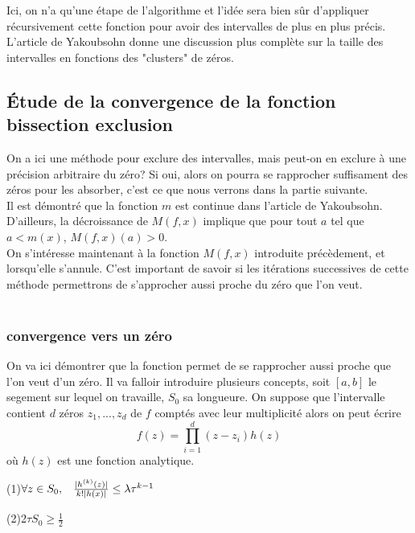 \documentclass[a4paper,10.5pt]{article}
\begin{document}
	\noindent Ici, on n'a qu'une étape de l'algorithme et l'idée sera bien sûr d'appliquer récursivement cette fonction pour avoir des intervalles de plus en plus précis. L'article de Yakoubsohn donne une discussion plus complète sur la taille des intervalles en fonctions des "clusters" de zéros.\\
	
	\subsection{Étude de la convergence de la fonction bissection exclusion}
	On a ici une méthode pour exclure des intervalles, mais peut-on en exclure à une précision arbitraire du zéro? Si oui, alors on pourra se rapprocher suffisament des zéros pour les absorber, c'est ce que nous verrons dans la partie suivante.\\
	Il est démontré que la fonction $m$ est continue dans l'article de Yakoubsohn. 
	D'ailleurs, la décroissance de $M(f,x)$ implique que pour tout $a$ tel que $a<m(x)$, $M(f,x)(a)>0$.\\
	On s'intéresse maintenant à la fonction $M(f,x)$ introduite précèdement, et lorsqu'elle s'annule. C'est important de savoir si les itérations successives de cette méthode permettrons de s'approcher aussi proche du zéro que l'on veut.\\
	\\
	\subsubsection{convergence vers un zéro}
	On va ici démontrer que la fonction permet de se rapprocher aussi proche que l'on veut d'un zéro.
	Il va falloir introduire plusieurs concepts, soit $[a,b]$  le segement sur lequel on travaille, $S_0$ sa longueure.
	On suppose que l'intervalle contient $d$ zéros $z_1,...,z_d$ de $f$ comptés avec leur multiplicité alors on peut écrire
	\[f(z)=\prod_{i=1}^{d}(z-z_i)h(z)\]
	où $h(z)$ est une fonction analytique.
	
	(1)$\forall z \in S_0, \hspace{3mm} \frac{|h^{(k)}(z)|}{k!|h(x)|}\leq \lambda \tau^{k-1}$
	
	(2)2$\tau S_0 \geq \frac{1}{2}$
	
\end{document}
